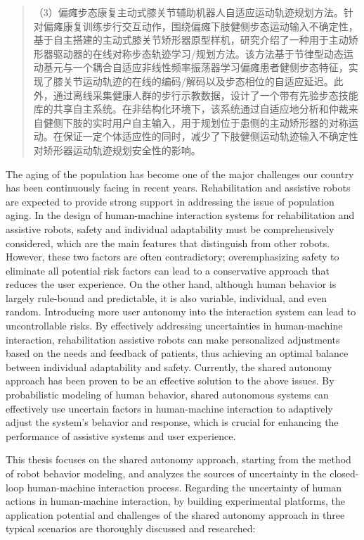 \begin{abstract}
（3）偏瘫步态康复主动式膝关节辅助机器人自适应运动轨迹规划方法。针对偏瘫康复训练步行交互动作，围绕偏瘫下肢健侧步态运动输入不确定性，基于自主搭建的主动式膝关节矫形器原型样机，研究介绍了一种用于主动矫形器驱动器的在线对称步态轨迹学习/规划方法。该方法基于节律型动态运动基元与一个耦合自适应非线性频率振荡器学习偏瘫患者健侧步态特征，实现了膝关节运动轨迹的在线的编码/解码以及步态相位的自适应延迟。此外，通过离线采集健康人群的步行示教数据，设计了一个带有先验步态技能库的共享自主系统。在非结构化环境下，该系统通过自适应地分析和仲裁来自健侧下肢的实时用户自主输入，用于规划位于患侧的主动矫形器的对称运动。在保证一定个体适应性的同时，减少了下肢健侧运动轨迹输入不确定性对矫形器运动轨迹规划安全性的影响。

\end{abstract}

\begin{abstract*}
The aging of the population has become one of the major challenges our country has been continuously facing in recent years. Rehabilitation and assistive robots are expected to provide strong support in addressing the issue of population aging. In the design of human-machine interaction systems for rehabilitation and assistive robots, safety and individual adaptability must be comprehensively considered, which are the main features that distinguish from other robots. However, these two factors are often contradictory; overemphasizing safety to eliminate all potential risk factors can lead to a conservative approach that reduces the user experience. On the other hand, although human behavior is largely rule-bound and predictable, it is also variable, individual, and even random. Introducing more user autonomy into the interaction system can lead to uncontrollable risks. By effectively addressing uncertainties in human-machine interaction, rehabilitation assistive robots can make personalized adjustments based on the needs and feedback of patients, thus achieving an optimal balance between individual adaptability and safety. Currently, the shared autonomy approach has been proven to be an effective solution to the above issues. By probabilistic modeling of human behavior, shared autonomous systems can effectively use uncertain factors in human-machine interaction to adaptively adjust the system's behavior and response, which is crucial for enhancing the performance of assistive systems and user experience. 

This thesis focuses on the shared autonomy approach, starting from the method of robot behavior modeling, and analyzes the sources of uncertainty in the closed-loop human-machine interaction process. Regarding the uncertainty of human actions in human-machine interaction, by building experimental platforms, the application potential and challenges of the shared autonomy approach in three typical scenarios are thoroughly discussed and researched:


\end{abstract*}
